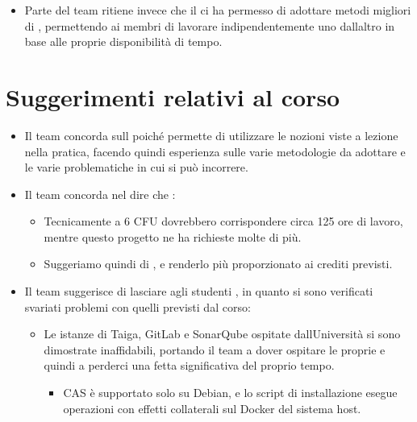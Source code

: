 \documentclass[letterpaper,10pt,italian]{sphinxmanual}
\begin{document}
\begin{itemize}
\item {} 
\sphinxAtStartPar
Parte del team ritiene invece che il  ci ha permesso di adottare metodi migliori di
, permettendo ai membri di lavorare indipendentemente uno dall\textquotesingle{}altro in base alle proprie
disponibilità di tempo.

\end{itemize}


\chapter{Suggerimenti relativi al corso}
\label{\detokenize{development/suggestions:suggerimenti-relativi-al-corso}}\label{\detokenize{development/suggestions::doc}}\begin{itemize}
\item {} 
\sphinxAtStartPar
Il team concorda sull\textquotesingle{} poiché permette di utilizzare le nozioni viste a lezione nella pratica,
facendo quindi esperienza sulle varie metodologie da adottare e le varie problematiche in cui si può incorrere.

\item {} 
\sphinxAtStartPar
Il team concorda nel dire che :
\begin{itemize}
\item {} 
\sphinxAtStartPar
Tecnicamente a 6 CFU dovrebbero corrispondere circa 125 ore di lavoro, mentre questo progetto ne ha richieste molte di più.

\item {} 
\sphinxAtStartPar
Suggeriamo quindi di , e renderlo più proporzionato ai
crediti previsti.

\end{itemize}

\item {} 
\sphinxAtStartPar
Il team suggerisce di lasciare agli studenti , in quanto si
sono verificati svariati problemi con quelli previsti dal corso:
\begin{itemize}
\item {} 
\sphinxAtStartPar
Le istanze di Taiga, GitLab e SonarQube ospitate dall\textquotesingle{}Università si sono dimostrate inaffidabili,
portando il team a dover ospitare le proprie e quindi a perderci una fetta significativa del proprio tempo.
\begin{itemize}
\item {} 
\sphinxAtStartPar
CAS è supportato solo su Debian, e lo script di installazione esegue operazioni con effetti collaterali sul
Docker del sistema host.


\end{itemize}
\end{itemize}
\end{itemize}
\end{document}
